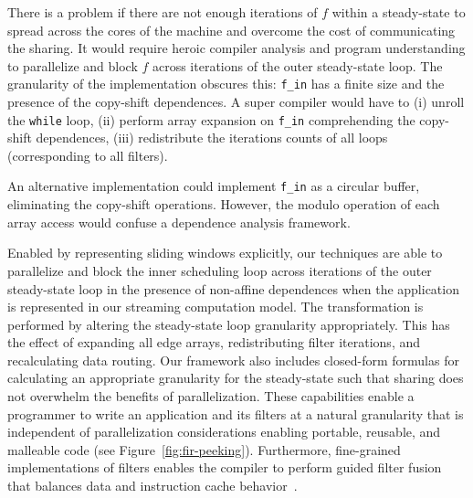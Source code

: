 There is a problem if there are not enough iterations of $f$ within a
steady-state to spread across the cores of the machine and overcome
the cost of communicating the sharing. It would require heroic
compiler analysis and program understanding to parallelize and block
$f$ across iterations of the outer steady-state loop.  The granularity
of the implementation obscures this: {\tt f\_in} has a finite size and
the presence of the copy-shift dependences.  A super compiler would
have to (i) unroll the {\tt while} loop, (ii) perform array expansion
on {\tt f\_in} comprehending the copy-shift dependences, (iii)
redistribute the iterations counts of all loops (corresponding to all
filters).

An alternative implementation could implement {\tt f\_in} as a
circular buffer, eliminating the copy-shift operations. However, the
modulo operation of each array access would confuse a dependence
analysis framework.

Enabled by representing sliding windows explicitly, our techniques are
able to parallelize and block the inner scheduling loop across
iterations of the outer steady-state loop in the presence of
non-affine dependences when the application is represented in our
streaming computation model.  The transformation is performed by
altering the steady-state loop granularity appropriately.  This has
the effect of expanding all edge arrays, redistributing filter
iterations, and recalculating data routing.  Our framework also
includes closed-form formulas for calculating an appropriate
granularity for the steady-state such that sharing does not overwhelm
the benefits of parallelization.  These capabilities enable a
programmer to write an application and its filters at a natural
granularity that is independent of parallelization considerations
enabling portable, reusable, and malleable code (see
Figure~\ref{fig:fir-peeking}).  Furthermore, fine-grained
implementations of filters enables the compiler to perform guided
filter fusion that balances data and instruction cache
behavior~\cite{sermulins-lctes05}.
